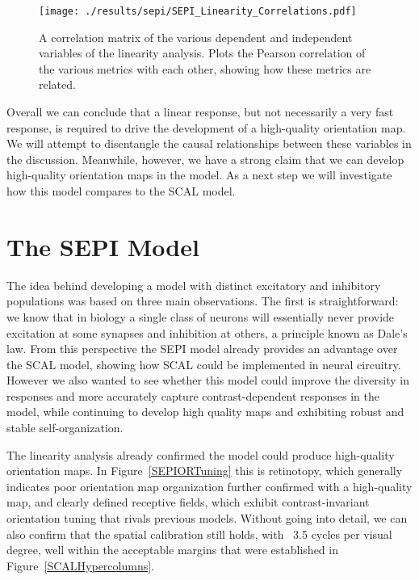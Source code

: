 \begin{figure}
	\centering
        \texttt{[image: ./results/sepi/SEPI\_Linearity\_Correlations.pdf]}
	\caption{A correlation matrix of the various dependent and
      independent variables of the linearity analysis. Plots the
      Pearson correlation of the various metrics with each other,
      showing how these metrics are related.}
	\label{SEPILinearityCorr}
\end{figure}

Overall we can conclude that a linear response, but not necessarily a
very fast response, is required to drive the development of a
high-quality orientation map. We will attempt to disentangle the
causal relationships between these variables in the
discussion. Meanwhile, however, we have a strong claim that we can develop
high-quality orientation maps in the model. As a next step we will
investigate how this model compares to the SCAL model.

\section{The SEPI Model}

The idea behind developing a model with distinct excitatory and
inhibitory populations was based on three main observations. The first
is straightforward: we know that in biology a single class of neurons
will essentially never provide excitation at some synapses and
inhibition at others, a principle known as Dale's law. From this
perspective the SEPI model already provides an advantage over the SCAL
model, showing how SCAL could be implemented in neural
circuitry. However we also wanted to see whether this model could
improve the diversity in responses and more accurately capture
contrast-dependent responses in the model, while continuing to develop
high quality maps and exhibiting robust and stable self-organization.

The linearity analysis already confirmed the model could produce
high-quality orientation maps. In Figure~\ref{SEPIORTuning} this is
retinotopy, which generally indicates poor orientation map
organization further confirmed with a high-quality map, and clearly
defined receptive fields, which exhibit contrast-invariant orientation
tuning that rivals previous models. Without going into detail, we can
also confirm that the spatial calibration still holds, with ~3.5
cycles per visual degree, well within the acceptable margins that were
established in Figure~\ref{SCALHypercolumns}.

